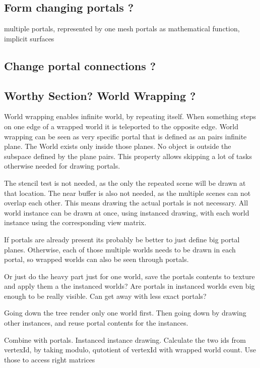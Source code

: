 \subsection{Form changing portals ?}
{multiple portals, represented by one mesh}
{portals as mathematical function, implicit surfaces }

\subsection{Change portal connections ?}



\subsection{Worthy Section? World Wrapping ?}
World wrapping enables infinite world, by repeating itself. When something steps on one edge of a wrapped world it is teleported to the opposite edge. World wrapping can be seen as very specific portal that is defined as an pairs infinite plane. The World exists only inside those planes. No object is outside the subspace defined by the plane pairs. This property allows skipping a lot of tasks otherwise needed for drawing portals.

The stencil test is not needed, as the only the repeated scene will be drawn at that location. The near buffer is also not needed, as the multiple scenes can not overlap each other. This means drawing the actual portals is not necessary. All world instance can be drawn at once, using instanced drawing, with each world instance using the corresponding view matrix.

If portals are already present its probably be better to just define big portal planes. Otherwise, each of those multiple worlds needs to be drawn in each portal, so wrapped worlds can also be seen through portals. 

Or just do the heavy part just for one world, save the portals contents to texture and apply them a the instanced worlds? Are portals in instanced worlds even big enough to be really visible. Can get away with less exact portals?

Going down the tree render only one world first. Then going down by drawing other instances, and reuse portal contents for the instances.

Combine with portals. Instanced instance drawing. Calculate the two ids from vertexId, by taking modulo, qutotient of vertexId with wrapped world count. Use those to access right matrices


